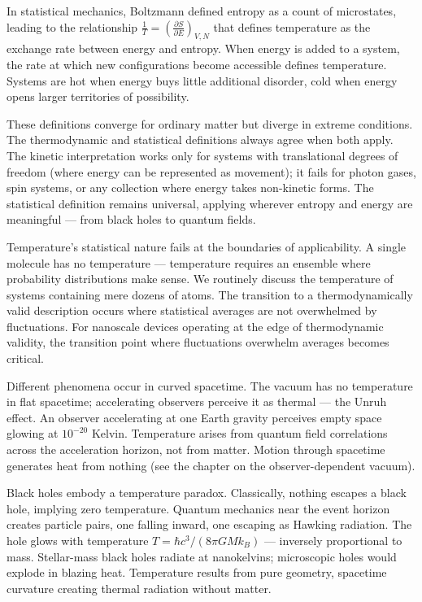 In statistical mechanics, Boltzmann defined entropy as a count of microstates, leading to the relationship $ \frac{1}{T} = \left( \frac{\partial S}{\partial E} \right)_{V,N} $ that defines temperature as the exchange rate between energy and entropy. When energy is added to a system, the rate at which new configurations become accessible defines temperature. Systems are hot when energy buys little additional disorder, cold when energy opens larger territories of possibility.

These definitions converge for ordinary matter but diverge in extreme conditions. The thermodynamic and statistical definitions always agree when both apply. The kinetic interpretation works only for systems with translational degrees of freedom (where energy can be represented as movement); it fails for photon gases, spin systems, or any collection where energy takes non-kinetic forms. The statistical definition remains universal, applying wherever entropy and energy are meaningful — from black holes to quantum fields.

Temperature's statistical nature fails at the boundaries of applicability. A single molecule has no temperature — temperature requires an ensemble where probability distributions make sense. We routinely discuss the temperature of systems containing mere dozens of atoms. The transition to a thermodynamically valid description occurs where statistical averages are not overwhelmed by fluctuations. For nanoscale devices operating at the edge of thermodynamic validity, the transition point where fluctuations overwhelm averages becomes critical.

Different phenomena occur in curved spacetime. The vacuum has no temperature in flat spacetime; accelerating observers perceive it as thermal — the Unruh effect. An observer accelerating at one Earth gravity perceives empty space glowing at $10^{-20}$ Kelvin. Temperature arises from quantum field correlations across the acceleration horizon, not from matter. Motion through spacetime generates heat from nothing (see the chapter on the observer-dependent vacuum).

Black holes embody a temperature paradox. Classically, nothing escapes a black hole, implying zero temperature. Quantum mechanics near the event horizon creates particle pairs, one falling inward, one escaping as Hawking radiation. The hole glows with temperature $T = \hbar c^3 / (8\pi G M k_B)$ — inversely proportional to mass. Stellar-mass black holes radiate at nanokelvins; microscopic holes would explode in blazing heat. Temperature results from pure geometry, spacetime curvature creating thermal radiation without matter.

